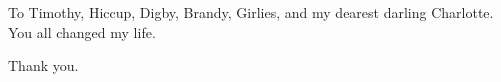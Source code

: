 To Timothy, Hiccup, Digby, Brandy, Girlies,
and my dearest darling Charlotte.
You all changed my life.

Thank you.